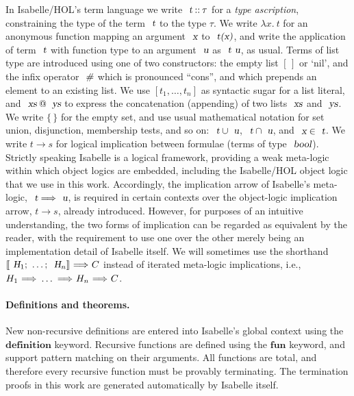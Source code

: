 In Isabelle/HOL's term language we write $\isa{t} \mathbin{::} \tau$ for a \emph{type ascription}, constraining the type of the term $\isa{t}$ to the type $\tau$.
We write $\lambda{x}.\: t$ for an anonymous function mapping an argument $\isa{x}$ to $\isa{t(x)}$, and write the application of term $\isa{t}$ with function type to an argument $\isa{u}$ as $\isa{t\ u}$, as usual.
Terms of list type are introduced using one of two constructors: the empty list $[\,]$ or `nil', and the infix operator $\isa{\#}$ which is pronounced ``cons'', and which prepends an element to an existing list.
We use $[t_1, \ldots, t_n]$ as syntactic sugar for a list literal, and $\isa{xs} \mathbin{\isacharat} \isa{ys}$ to express the concatenation (appending) of two lists $\isa{xs}$ and $\isa{ys}$.
We write $\{\,\}$ for the empty set, and use usual mathematical notation for set union, disjunction, membership tests, and so on: $\isa{t} \cup \isa{u}$, $\isa{t} \cap \isa{u}$, and $\isa{x} \in \isa{t}$.
We write $t \longrightarrow s$ for logical implication between formulae (terms of type $\isa{bool}$).
Strictly speaking Isabelle is a logical framework, providing a weak meta-logic within which object logics are embedded, including the Isabelle/HOL object logic that we use in this work.
Accordingly, the implication arrow of Isabelle's meta-logic, $\isa{t} \Longrightarrow \isa{u}$, is required in certain contexts over the object-logic implication arrow, $t \longrightarrow s$, already introduced.
However, for purposes of an intuitive understanding, the two forms of implication can be regarded as equivalent by the reader, with the requirement to use one over the other merely being an implementation detail of Isabelle itself.
We will sometimes use the shorthand ${\isasymlbrakk}\isa{H}_1{\isacharsemicolon}\ \ldots{\isacharsemicolon}\ \isa{H}_n{\isasymrbrakk}\ {\isasymLongrightarrow}\ C$ instead of iterated meta-logic implications, i.e., $H_1\ {\isasymLongrightarrow}\ \ldots\ {\isasymLongrightarrow}\ H_n\ {\isasymLongrightarrow}\ C$.

\paragraph{Definitions and theorems.}

New non-recursive definitions are entered into Isabelle's global context using the $\mathbf{definition}$ keyword.
Recursive functions are defined using the $\mathbf{fun}$ keyword, and support pattern matching on their arguments.
All functions are total, and therefore every recursive function must be provably terminating.
The termination proofs in this work are generated automatically by Isabelle itself.

